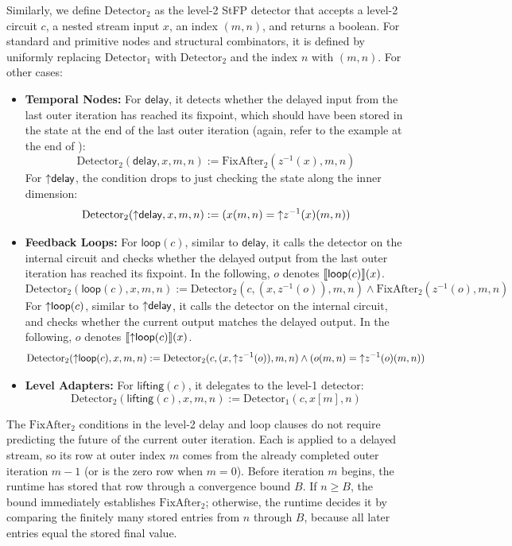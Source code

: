 \begin{definition}
    Similarly, we define $\text{Detector}_2$ as the level-2 StFP detector that accepts a level-2 circuit $c$, a nested stream input $x$, an index $(m, n)$, and returns a boolean. For standard and primitive nodes and structural combinators, it is defined by uniformly replacing $\text{Detector}_1$ with $\text{Detector}_2$ and the index $n$ with $(m, n)$. For other cases:
    \begin{itemize}
        \item \textbf{Temporal Nodes:} For $\mathsf{delay}$, it detects whether the delayed input from the last outer iteration has reached its fixpoint, which should have been stored in the state at the end of the last outer iteration (again, refer to the example at the end of ): 
        \[\text{Detector}_2(\mathsf{delay}, x, m, n) := \text{FixAfter}_2(z^{-1}(x), m, n)\] 
        For $\mathsf{{\uparrow}delay}$, the condition drops to just checking the state along the inner dimension: 
        \[\text{Detector}_2(\mathsf{{\uparrow}delay}, x, m, n) := (x(m, n) = {\uparrow}z^{-1}(x)(m, n))\]
        \item \textbf{Feedback Loops:} For $\mathsf{loop}(c)$, similar to $\mathsf{delay}$, it calls the detector on the internal circuit and checks whether the delayed output from the last outer iteration has reached its fixpoint. In the following, $o$ denotes $\llbracket \mathsf{loop}(c) \rrbracket(x)$.
        \[\text{Detector}_2(\mathsf{loop}(c), x, m, n) := \text{Detector}_2(c, (x, z^{-1}(o)), m, n) \land \text{FixAfter}_2(z^{-1}(o), m, n)\] 
        For $\mathsf{{\uparrow}loop}(c)$, similar to $\mathsf{{\uparrow}delay}$, it calls the detector on the internal circuit, and checks whether the current output matches the delayed output. In the following, $o$ denotes $\llbracket \mathsf{{\uparrow}loop}(c) \rrbracket(x)$.
        \[\text{Detector}_2(\mathsf{{\uparrow}loop}(c), x, m, n) := \text{Detector}_2(c, (x, {\uparrow}z^{-1}(o)), m, n) \land (o(m, n) = {\uparrow}z^{-1}(o)(m, n))\]
        \item \textbf{Level Adapters:} For $\mathsf{lifting}(c)$, it delegates to the level-1 detector: 
        \[\text{Detector}_2(\mathsf{lifting}(c), x, m, n) := \text{Detector}_1(c, x[m], n)\]
    \end{itemize}
\end{definition}

The $\text{FixAfter}_2$ conditions in the level-2 delay and loop clauses do not require predicting the future of the current outer iteration. Each is applied to a delayed stream, so its row at outer index $m$ comes from the already completed outer iteration $m-1$ (or is the zero row when $m=0$). Before iteration $m$ begins, the runtime has stored that row through a convergence bound $B$. If $n \geq B$, the bound immediately establishes $\text{FixAfter}_2$; otherwise, the runtime decides it by comparing the finitely many stored entries from $n$ through $B$, because all later entries equal the stored final value.

